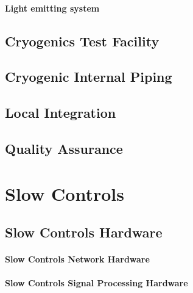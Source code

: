 \paragraph{Light emitting system}


\subsection{Cryogenics Test Facility}
\label{sec:fdsp-slow-cryo-test-facil}

\subsection{Cryogenic Internal Piping}
\label{sec:fdsp-slow-cryo-int-piping}

\subsection{Local Integration}
\label{sec:fdsp-slow-cryo-loc-integ}


\subsection{Quality Assurance}
\label{sec:fdsp-slow-cryo-qa}



\section{Slow Controls}
\label{sec:fdsp-slow-cryo-ctrl}




\subsection{Slow Controls Hardware}
\label{sec:fdsp-slow-cryo-hdwr}

\paragraph{Slow Controls Network Hardware}

\paragraph{Slow Controls Signal Processing Hardware}

